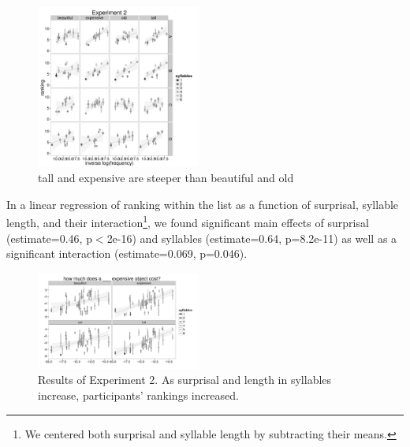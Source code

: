 \documentclass[10pt,letterpaper]{article}
\begin{document}
\begin{figure}[ht]
\begin{center}
\includegraphics[width=0.48\textwidth]{analysis_files_for_writeup/images/exp2-main.png}
\end{center}
\caption{tall and expensive are steeper than beautiful and old} 
\label{exp2-main}
\end{figure}

In a linear regression of ranking within the list as a function of surprisal, syllable length, and their interaction\footnote{We centered both surprisal and syllable length by subtracting their means.}, we found significant main effects of surprisal (estimate=0.46, p$<$2e-16) and syllables (estimate=0.64, p=8.2e-11) as well as a significant interaction (estimate=0.069, p=0.046).


\begin{figure}[ht]
\begin{center}
\includegraphics[width=0.48\textwidth]{analysis_files_for_writeup/images/exp2-plot.png}
\end{center}
\caption{Results of Experiment 2. As surprisal and length in syllables increase, participants' rankings increased.} 
\label{exp2-plot}
\end{figure}
\end{document}
